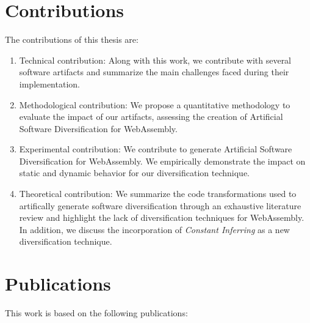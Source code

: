 \renewcommand{\rqtwo}{$RQ_2$. To what extent are the generated variants dynamically different?}
\renewcommand{\rqthree}{$RQ_3$. To what extent do the artificial variants exhibit different execution times on Edge-Cloud platforms?}

\section{Contributions}

The contributions of this thesis are:

\begin{enumerate}[label=\subscript{C}{{\arabic*}}]
    \item Technical contribution: Along with this work, we contribute with several software artifacts and summarize the main challenges faced during their implementation.
    
    \item Methodological contribution: We propose a quantitative methodology to evaluate the impact of our artifacts, assessing the creation of Artificial Software Diversification for WebAssembly.  
    
    \item Experimental contribution: We contribute to generate Artificial Software Diversification for WebAssembly. We empirically demonstrate the impact on static and dynamic behavior for our diversification technique.
    
    \item Theoretical contribution: We summarize the code transformations used to artifically generate software diversification through an exhaustive literature review and highlight the lack of diversification techniques for WebAssembly. In addition, we discuss the incorporation of \emph{Constant Inferring} as a new diversification technique.
\end{enumerate}

\section{Publications}

This work is based on the following publications:


